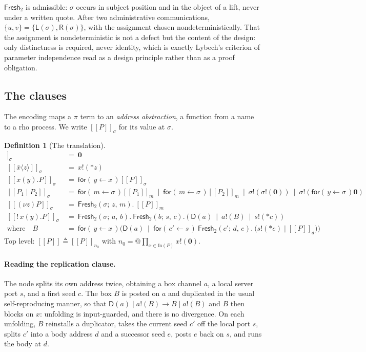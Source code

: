 \documentclass[11pt]{article}
\makeatletter
\theoremstyle{definition}
\newtheorem{definition}{Definition}[section]
\theoremstyle{plain}
\theoremstyle{remark}
\newcommand{\quo}[1]{@#1}
\newcommand{\drp}[1]{{*}#1}
\newcommand{\inp}[3]{\mathsf{for}(\,#1 \leftarrow #2\,)#3}
\newcommand{\out}[2]{#1!(#2)}
\newcommand{\enc}[1]{[\![#1]\!]}
\newcommand{\nil}{\mathbf{0}}
\newcommand{\Lft}{\mathsf{L}}
\newcommand{\Rgt}{\mathsf{R}}
\newcommand{\Frsh}{\mathsf{Fresh}_2}
\newcommand{\Dup}{\mathsf{D}}
\newcommand{\fn}{\mathrm{fn}}
\makeatother
\begin{document}
$\Frsh$ is admissible: $\sigma$ occurs in subject position and in the
object of a lift, never under a written quote. After two administrative
communications, $\{u,v\} = \{\Lft(\sigma), \Rgt(\sigma)\}$, with the
assignment chosen nondeterministically. That the assignment is
nondeterministic is not a defect but the content of the design: only
distinctness is required, never identity, which is exactly Lybech's
criterion of parameter independence read as a design principle rather than
as a proof obligation.

\subsection{The clauses}

The encoding maps a $\pi$ term to an \emph{address abstraction}, a
function from a name to a rho process. We write $\enc{P}_\sigma$ for its
value at $\sigma$.

\begin{definition}[The translation]\label{def:translation}
\begin{align*}
\enc{\nil}_\sigma \ &=\ \nil \\[2pt]
\enc{\bar x\langle z\rangle}_\sigma \ &=\ \out{x}{\drp{z}} \\[2pt]
\enc{x(y).P}_\sigma \ &=\ \inp{y}{x}{\enc{P}_\sigma} \\[2pt]
\enc{P_1 \mid P_2}_\sigma \ &=\
  \inp{m}{\sigma}{\enc{P_1}_m}
  \ \mid\ \inp{m}{\sigma}{\enc{P_2}_m}
  \ \mid\ \out{\sigma}{\out{\sigma}{\nil}}
  \ \mid\ \out{\sigma}{\inp{y}{\sigma}{\nil}} \\[2pt]
\enc{(\nu z)P}_\sigma \ &=\ \Frsh(\sigma;\, z,\, m).\ \enc{P}_m \\[2pt]
\enc{!\,x(y).P}_\sigma \ &=\
  \Frsh(\sigma;\, a,\, b).\ \Frsh(b;\, s,\, c).\
  \Big(\ \Dup(a)
  \ \mid\ \out{a}{B}
  \ \mid\ \out{s}{\drp{c}}\ \Big)
\\
\text{where}\quad
B \ &=\ \inp{y}{x}{\Big(\Dup(a) \ \mid\
        \inp{c'}{s}{\ \Frsh(c';\, d,\, e).\ \big(\out{s}{\drp{e}} \mid \enc{P}_d\big)}\Big)}
\end{align*}
Top level: $\enc{P} \triangleq \enc{P}_{n_0}$ with
$n_0 = \quo{\prod_{x \in \fn(P)} \out{x}{\nil}}$.
\end{definition}

\paragraph{Reading the replication clause.}
The node splits its own address twice, obtaining a box channel $a$, a
local server port $s$, and a first seed $c$. The box $B$ is posted on $a$
and duplicated in the usual self-reproducing manner, so that
$\Dup(a) \mid \out{a}{B} \to B \mid \out{a}{B}$ and $B$ then blocks on
$x$: unfolding is input-guarded, and there is no divergence. On each
unfolding, $B$ reinstalls a duplicator, takes the current seed $c'$ off
the local port $s$, splits $c'$ into a body address $d$ and a successor
seed $e$, posts $e$ back on $s$, and runs the body at $d$.
\end{document}
